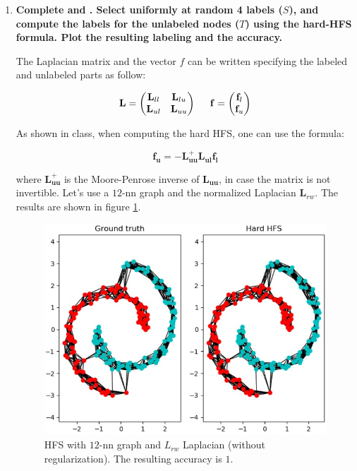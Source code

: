 \documentclass[a4paper, 11pt]{report}
\begin{document}
\begin{enumerate}
	\item \textbf{Complete  and . Select uniformly at random 4 labels ($S$), and compute the labels for the unlabeled nodes ($T$) using the hard-HFS formula. Plot the resulting labeling and the accuracy.}
	
    The Laplacian matrix and the vector $f$ can be written specifying the labeled and unlabeled parts as follow:
    
    \begin{equation*}
        \mathbf{L} = \begin{pmatrix}
            \mathbf{L}_{ll} & \mathbf{L}_{lu} \\
            \mathbf{L}_{ul} & \mathbf{L}_{uu}
        \end{pmatrix}
        \hspace*{.5cm}
        \mathbf{f} = \begin{pmatrix}
            \mathbf{f}_{l} \\
            \mathbf{f}_{u}
        \end{pmatrix}
    \end{equation*}
	
	As shown in class, when computing the hard HFS, one can use the formula:
	
	\begin{equation*}
	    \mathbf{f_{u}} = - \mathbf{L_{uu}^{+}} \mathbf{L_{ul}} \mathbf{f_{l}}
	\end{equation*}
	
	where $\mathbf{L_{uu}^{+}}$ is the Moore-Penrose inverse of $\mathbf{L_{uu}}$, in case the matrix is not invertible. Let's use a $12$-nn graph and the normalized Laplacian $\mathbf{L}_{rw}$. The results are shown in figure \ref{fig:q11-hard-hfs}. \\
	
	\begin{figure}[!htb]
	    \centering
	    \includegraphics[width=.5\textwidth]{images/q11_hard-hfs.jpg}
	    \caption{HFS with $12$-nn graph and $L_{rw}$ Laplacian (without regularization). The resulting accuracy is $1$.}
	    \label{fig:q11-hard-hfs}
	\end{figure}
	

\end{enumerate}
\end{document}

